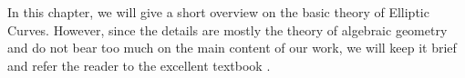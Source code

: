 
In this chapter, we will give a short overview on the basic theory of Elliptic Curves.
However, since the details are mostly the theory of algebraic geometry and do not bear too much on the main content of our work, we will keep it brief and refer the reader to the excellent textbook \cite{arithmetic_elliptic_curves}.
